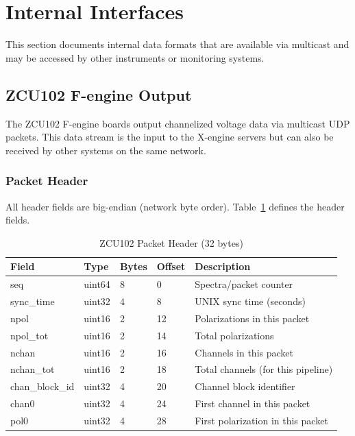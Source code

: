 
\section{Internal Interfaces}

This section documents internal data formats that are available via multicast and may be accessed by other instruments or monitoring systems.

\subsection{ZCU102 F-engine Output}

The ZCU102 F-engine boards output channelized voltage data via multicast UDP packets. This data stream is the input to the X-engine servers but can also be received by other systems on the same network.

\subsubsection{Packet Header}

All header fields are big-endian (network byte order).  Table~\ref{tab:zcu102-header} defines the header fields.

\begin{table}[htbp]
    \centering
    \caption{ZCU102 Packet Header (32 bytes)}
    \label{tab:zcu102-header}
    \begin{tabular}{lllll}
        \toprule
        \textbf{Field} & \textbf{Type} & \textbf{Bytes} & \textbf{Offset} & \textbf{Description} \\
        \midrule
        seq & uint64 & 8 & 0 & Spectra/packet counter \\
        sync\_time & uint32 & 4 & 8 & UNIX sync time (seconds) \\
        npol & uint16 & 2 & 12 & Polarizations in this packet \\
        npol\_tot & uint16 & 2 & 14 & Total polarizations \\
        nchan & uint16 & 2 & 16 & Channels in this packet \\
        nchan\_tot & uint16 & 2 & 18 & Total channels (for this pipeline) \\
        chan\_block\_id & uint32 & 4 & 20 & Channel block identifier \\
        chan0 & uint32 & 4 & 24 & First channel in this packet \\
        pol0 & uint32 & 4 & 28 & First polarization in this packet \\
        \bottomrule
    \end{tabular}
\end{table}

